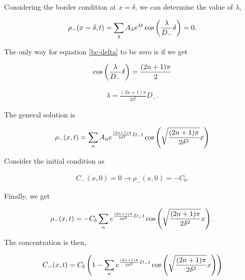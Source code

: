 Considering the border condition at $x=\delta$, we can determine the value of $\lambda$,


\begin{align}
	\rho_-(x=\delta,t) = \sum_{\lambda} A_\lambda e^{\lambda t} \cos\left({\frac{\lambda}{D_-} \delta}\right) = 0.
	\label{bc-delta}
\end{align}

The only way for equation \ref{bc-delta} to be zero is if we get

\begin{align}\nonumber
	\cos\left({\frac{\lambda}{D_-} \delta}\right) = \frac{(2n+1)\pi}{2}
\end{align}


\begin{align}
	\lambda = \frac{(2n+1)\pi}{2\delta^2}D_-.
\end{align}

The general solution is


\begin{align}
	\rho_-(x,t) = \sum_{n} A_n e^{\frac{(2n+1)\pi}{2\delta^2}D_- t} \cos\left({\sqrt{\frac{(2n+1)\pi}{2\delta^2}} x}\right)
	\label{bc-delta}
\end{align}

Consider the initial condition as

\begin{align}
	C_-(x,0) = 0 \rightarrow \rho_-(x,0) = -C_b.
\end{align}

Finally, we get

\begin{align}
	\rho_- (x,t) = -C_b\sum_{n}e^{\frac{(2n+1)\pi}{2\delta^2}D_- t} \cos\left({\sqrt{\frac{(2n+1)\pi}{2\delta^2}} x}\right).
\end{align}

The concentration is then,

\begin{align}
	C_- (x,t) =C_b\left({1-\sum_{n}e^{\frac{(2n+1)\pi}{2\delta^2}D_- t} \cos\left({\sqrt{\frac{(2n+1)\pi}{2\delta^2}} x}\right)}\right)
\end{align}





